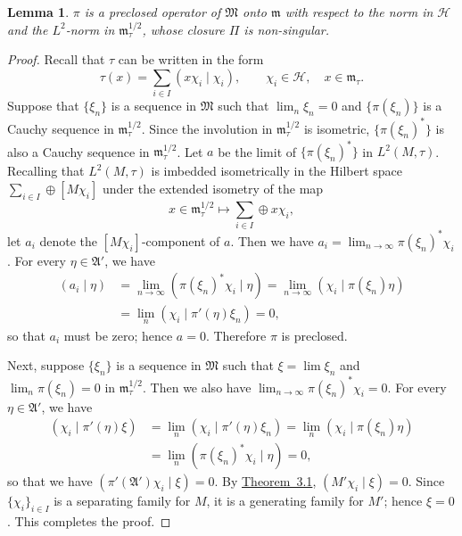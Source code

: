\documentclass[12pt,b5paper,twoside]{article}
\theoremstyle{takesaki}
\newtheorem{lemma}{Lemma}[section]
\numberwithin{equation}{section}
\begin{document}
\begin{lemma}\label{lem:14.9}
$\pi$ is a preclosed operator of $\mathfrak M$ onto $\mathfrak m$ with
respect to the norm in $\mathcal H$ and the $L^2$-norm in
$\mathfrak m_\tau^{1/2}$, whose closure $\Pi$ is non-singular.
\end{lemma}

\begin{proof}
Recall that $\tau$ can be written in the form
\[
 \tau(x)=\sum_{i\in I}(x\chi_i\mid\chi_i),
 \qquad \chi_i\in\mathcal H,\quad x\in\mathfrak m_\tau.
\]
Suppose that $\{\xi_n\}$ is a sequence in $\mathfrak M$ such that
$\lim_n\xi_n=0$ and $\{\pi(\xi_n)\}$ is a Cauchy sequence in
$\mathfrak m_\tau^{1/2}$.  Since the involution in
$\mathfrak m_\tau^{1/2}$ is isometric, $\{\pi(\xi_n)^*\}$ is also a
Cauchy sequence in $\mathfrak m_\tau^{1/2}$.  Let $a$ be the limit of
$\{\pi(\xi_n)^*\}$ in $L^2(M,\tau)$.  Recalling that $L^2(M,\tau)$ is
imbedded isometrically in the Hilbert space
$\sum_{i\in I}\oplus[M\chi_i]$ under the extended isometry of the map
\[
 x\in\mathfrak m_\tau^{1/2}\longmapsto
 \sum_{i\in I}\oplus x\chi_i,
\]
let $a_i$ denote the $[M\chi_i]$-component of $a$.  Then we have
$a_i=\lim_{n\to\infty}\pi(\xi_n)^*\chi_i$.  For every
$\eta\in\mathfrak A'$, we have
\begin{align*}
 (a_i\mid\eta)
 &=\lim_{n\to\infty}(\pi(\xi_n)^*\chi_i\mid\eta)
  =\lim_{n\to\infty}(\chi_i\mid\pi(\xi_n)\eta)\\
 &=\lim_n(\chi_i\mid\pi'(\eta)\xi_n)=0,
\end{align*}
so that $a_i$ must be zero; hence $a=0$.  Therefore $\pi$ is
preclosed.

Next, suppose $\{\xi_n\}$ is a sequence in $\mathfrak M$ such that
$\xi=\lim\xi_n$ and $\lim_n\pi(\xi_n)=0$ in
$\mathfrak m_\tau^{1/2}$.  Then we also have
$\lim_{n\to\infty}\pi(\xi_n)^*\chi_i=0$.  For every
$\eta\in\mathfrak A'$, we have
\begin{align*}
 (\chi_i\mid\pi'(\eta)\xi)
 &=\lim_n(\chi_i\mid\pi'(\eta)\xi_n)
  =\lim_n(\chi_i\mid\pi(\xi_n)\eta)\\
 &=\lim_n(\pi(\xi_n)^*\chi_i\mid\eta)=0,
\end{align*}
so that we have $(\pi'(\mathfrak A')\chi_i\mid\xi)=0$.  By
\hyperref[thm:3.1]{Theorem~3.1}, $(M'\chi_i\mid\xi)=0$.  Since
$\{\chi_i\}_{i\in I}$ is a separating family for $M$, it is a
generating family for $M'$; hence $\xi=0$.  This completes the proof.
\end{proof}
\end{document}
